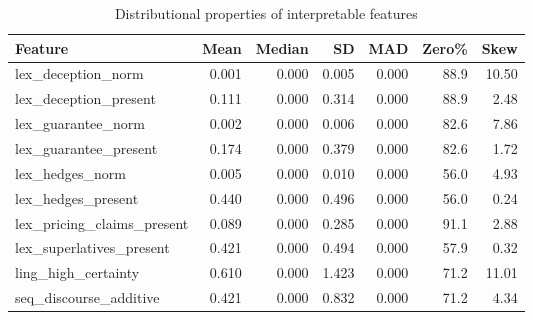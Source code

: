 \begin{table}[htbp]
\centering
\caption{Distributional properties of interpretable features}
\label{tab:feature_summary}
\begin{tabular}{lrrrrrr}
\toprule
Feature & Mean & Median & SD & MAD & Zero\% & Skew \\
\midrule
lex\_deception\_norm & 0.001 & 0.000 & 0.005 & 0.000 & 88.9 & 10.50 \\
lex\_deception\_present & 0.111 & 0.000 & 0.314 & 0.000 & 88.9 & 2.48 \\
lex\_guarantee\_norm & 0.002 & 0.000 & 0.006 & 0.000 & 82.6 & 7.86 \\
lex\_guarantee\_present & 0.174 & 0.000 & 0.379 & 0.000 & 82.6 & 1.72 \\
lex\_hedges\_norm & 0.005 & 0.000 & 0.010 & 0.000 & 56.0 & 4.93 \\
lex\_hedges\_present & 0.440 & 0.000 & 0.496 & 0.000 & 56.0 & 0.24 \\
lex\_pricing\_claims\_present & 0.089 & 0.000 & 0.285 & 0.000 & 91.1 & 2.88 \\
lex\_superlatives\_present & 0.421 & 0.000 & 0.494 & 0.000 & 57.9 & 0.32 \\
ling\_high\_certainty & 0.610 & 0.000 & 1.423 & 0.000 & 71.2 & 11.01 \\
seq\_discourse\_additive & 0.421 & 0.000 & 0.832 & 0.000 & 71.2 & 4.34 \\
\bottomrule
\end{tabular}
\end{table}
